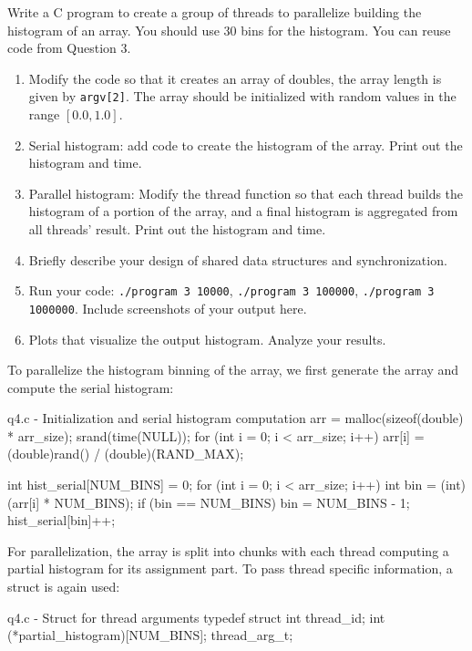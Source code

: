 \documentclass[../main.tex]{subfiles}
\begin{document}
Write a C program to create a group of threads to parallelize building the histogram of an array. You should use 30 bins for the histogram. You can reuse code from Question 3.

\begin{enumerate}
    \item Modify the code so that it creates an array of doubles, the array length is given by \lstinline{argv[2]}. The array should be initialized with random values in the range $[0.0, 1.0]$.
    \item Serial histogram: add code to create the histogram of the array. Print out the histogram and time.
    \item Parallel histogram: Modify the thread function so that each thread builds the histogram of a portion of the array, and a final histogram is aggregated from all threads' result. Print out the histogram and time.
    \item Briefly describe your design of shared data structures and synchronization.
    \item Run your code: \lstinline{./program 3 10000}, \lstinline{./program 3 100000}, \lstinline{./program 3 1000000}. Include screenshots of your output here.
    \item Plots that visualize the output histogram. Analyze your results.
\end{enumerate}

\solution

To parallelize the histogram binning of the array, we first generate the array and compute the serial histogram:

\begin{cppcode}{q4.c - Initialization and serial histogram computation}
arr = malloc(sizeof(double) * arr_size);
srand(time(NULL));
for (int i = 0; i < arr_size; i++)
{
    arr[i] = (double)rand() / (double)(RAND_MAX);
}

int hist_serial[NUM_BINS] = {0};
for (int i = 0; i < arr_size; i++)
{
    int bin = (int)(arr[i] * NUM_BINS);
    if (bin == NUM_BINS) bin = NUM_BINS - 1;
    hist_serial[bin]++;
}
\end{cppcode}

For parallelization, the array is split into chunks with each thread computing a partial histogram for its assignment part. To pass thread specific information, a struct is again used:

\begin{cppcode}{q4.c - Struct for thread arguments}
typedef struct{
    int thread_id;
    int (*partial_histogram)[NUM_BINS];
} thread_arg_t;
\end{cppcode}
\end{document}
